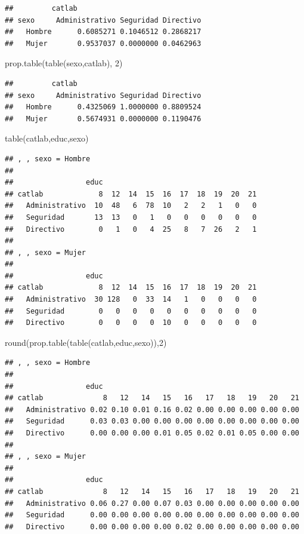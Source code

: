 \documentclass[
]{book}
\newenvironment{Shaded}{\begin{snugshade}}{\end{snugshade}}
\newcommand{\DecValTok}[1]{\textcolor[rgb]{0.00,0.00,0.81}{#1}}
\newcommand{\FunctionTok}[1]{\textcolor[rgb]{0.00,0.00,0.00}{#1}}
\newcommand{\NormalTok}[1]{#1}
\theoremstyle{break}
\theoremstyle{nonumberplain}
\begin{document}
\begin{verbatim}
##         catlab
## sexo     Administrativo Seguridad Directivo
##   Hombre      0.6085271 0.1046512 0.2868217
##   Mujer       0.9537037 0.0000000 0.0462963
\end{verbatim}

\begin{Shaded}
\begin{Highlighting}[]
\FunctionTok{prop.table}\NormalTok{(}\FunctionTok{table}\NormalTok{(sexo,catlab), }\DecValTok{2}\NormalTok{)}
\end{Highlighting}
\end{Shaded}

\begin{verbatim}
##         catlab
## sexo     Administrativo Seguridad Directivo
##   Hombre      0.4325069 1.0000000 0.8809524
##   Mujer       0.5674931 0.0000000 0.1190476
\end{verbatim}

\begin{Shaded}
\begin{Highlighting}[]
\FunctionTok{table}\NormalTok{(catlab,educ,sexo)}
\end{Highlighting}
\end{Shaded}

\begin{verbatim}
## , , sexo = Hombre
## 
##                 educ
## catlab             8  12  14  15  16  17  18  19  20  21
##   Administrativo  10  48   6  78  10   2   2   1   0   0
##   Seguridad       13  13   0   1   0   0   0   0   0   0
##   Directivo        0   1   0   4  25   8   7  26   2   1
## 
## , , sexo = Mujer
## 
##                 educ
## catlab             8  12  14  15  16  17  18  19  20  21
##   Administrativo  30 128   0  33  14   1   0   0   0   0
##   Seguridad        0   0   0   0   0   0   0   0   0   0
##   Directivo        0   0   0   0  10   0   0   0   0   0
\end{verbatim}

\begin{Shaded}
\begin{Highlighting}[]
\FunctionTok{round}\NormalTok{(}\FunctionTok{prop.table}\NormalTok{(}\FunctionTok{table}\NormalTok{(catlab,educ,sexo)),}\DecValTok{2}\NormalTok{)}
\end{Highlighting}
\end{Shaded}

\begin{verbatim}
## , , sexo = Hombre
## 
##                 educ
## catlab              8   12   14   15   16   17   18   19   20   21
##   Administrativo 0.02 0.10 0.01 0.16 0.02 0.00 0.00 0.00 0.00 0.00
##   Seguridad      0.03 0.03 0.00 0.00 0.00 0.00 0.00 0.00 0.00 0.00
##   Directivo      0.00 0.00 0.00 0.01 0.05 0.02 0.01 0.05 0.00 0.00
## 
## , , sexo = Mujer
## 
##                 educ
## catlab              8   12   14   15   16   17   18   19   20   21
##   Administrativo 0.06 0.27 0.00 0.07 0.03 0.00 0.00 0.00 0.00 0.00
##   Seguridad      0.00 0.00 0.00 0.00 0.00 0.00 0.00 0.00 0.00 0.00
##   Directivo      0.00 0.00 0.00 0.00 0.02 0.00 0.00 0.00 0.00 0.00
\end{verbatim}
\end{document}
